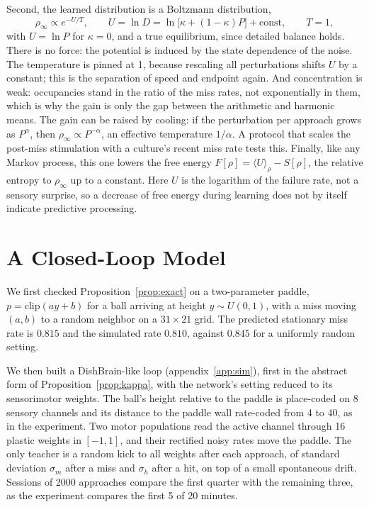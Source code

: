 \documentclass[12pt]{article}
\numberwithin{equation}{section}
\begin{document}
Second, the learned distribution is a Boltzmann distribution,
\begin{equation}
\rho_\infty\propto e^{-U/T},\qquad U=\ln D=\ln\bigl[\kappa+(1-\kappa)P\bigr]+\text{const},\qquad T=1,
\label{eq:boltzmann}
\end{equation}
with $U=\ln P$ for $\kappa=0$, and a true equilibrium, since detailed balance holds. There is no force: the potential is induced by the state dependence of the noise. The temperature is pinned at 1, because rescaling all perturbations shifts $U$ by a constant; this is the separation of speed and endpoint again. And concentration is weak: occupancies stand in the ratio of the miss rates, not exponentially in them, which is why the gain is only the gap between the arithmetic and harmonic means. The gain can be raised by cooling: if the perturbation per approach grows as $P^\alpha$, then $\rho_\infty\propto P^{-\alpha}$, an effective temperature $1/\alpha$. A protocol that scales the post-miss stimulation with a culture's recent miss rate tests this. Finally, like any Markov process, this one lowers the free energy $F[\rho]=\langle U\rangle_\rho-S[\rho]$, the relative entropy to $\rho_\infty$ up to a constant. Here $U$ is the logarithm of the failure rate, not a sensory surprise, so a decrease of free energy during learning does not by itself indicate predictive processing.

\section{A Closed-Loop Model}\label{sec:model}

We first checked Proposition~\ref{prop:exact} on a two-parameter paddle, $p=\mathrm{clip}(ay+b)$ for a ball arriving at height $y\sim U(0,1)$, with a miss moving $(a,b)$ to a random neighbor on a $31\times21$ grid. The predicted stationary miss rate is $0.815$ and the simulated rate $0.810$, against $0.845$ for a uniformly random setting.

We then built a DishBrain-like loop (appendix~\ref{app:sim}), first in the abstract form of Proposition~\ref{prop:kappa}, with the network's setting reduced to its sensorimotor weights. The ball's height relative to the paddle is place-coded on 8 sensory channels and its distance to the paddle wall rate-coded from 4 to 40, as in the experiment. Two motor populations read the active channel through 16 plastic weights in $[-1,1]$, and their rectified noisy rates move the paddle. The only teacher is a random kick to all weights after each approach, of standard deviation $\sigma_m$ after a miss and $\sigma_h$ after a hit, on top of a small spontaneous drift. Sessions of 2000 approaches compare the first quarter with the remaining three, as the experiment compares the first 5 of 20 minutes.
\end{document}
